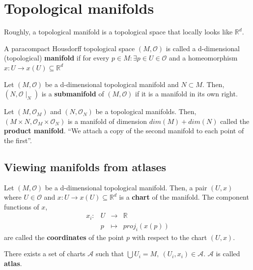 \documentclass[root.tex]{subfiles}
\begin{document}
\chapter{Topological manifolds}%
Roughly, a topological manifold is a topological space that locally looks like $\mathbb{R}^d$.
\begin{mydef}
  A paracompact Housdorff topological space $(M, \mathcal{O})$ is called a d-dimensional (topological) \textbf{manifold} if for every $p\in M: \exists p \in U \in \mathcal{O}$ and a homeomorphism $x:U \rightarrow x(U) \subseteq \mathbb{R}^d$
\end{mydef}
\begin{mydef}
  Let $(M,\mathcal{O})$ be a d-dimensional topological manifold and $N \subset M$. Then, $(N,\mathcal{O}\mid_N)$ is a \textbf{submanifold} of $(M,\mathcal{O})$ if it is a manifold in its own right.
\end{mydef}
\begin{mydef}
  Let $(M,\mathcal{O}_M)$ and $(N,\mathcal{O}_N)$ be a topological manifolds. Then, $(M\times N, \mathcal{O}_M \times \mathcal{O}_N)$ is a manifold of dimension $dim(M) + dim(N)$ called the \textbf{product manifold}. ``We attach a copy of the second manifold to each point of the first''.
\end{mydef}
\section{Viewing manifolds from atlases}
\begin{mydef}
  Let $(M,\mathcal{O})$ be a d-dimensional topological manifold. Then, a pair $(U,x)$ where $U\in \mathcal{O}$ and $x : U \rightarrow x(U) \subseteq \mathbb{R}^d$ is a \textbf{chart} of the manifold. The component functions of $x$,
$$ 
\begin{aligned}
  x_i :& U   & \to     & \mathbb{R}\\
       & p   & \mapsto & proj_i(x(p))
\end{aligned} 
$$
are called the \textbf{coordinates} of the point $p$ with respect to the chart $(U,x)$.
\end{mydef}
\begin{remark}
  There exists a set of charts $\mathcal{A}$ such that $\bigcup U_i = M,\ (U_i, x_i) \in \mathcal{A}$. $\mathcal{A}$ is called \textbf{atlas}.
\end{remark}
\end{document}
